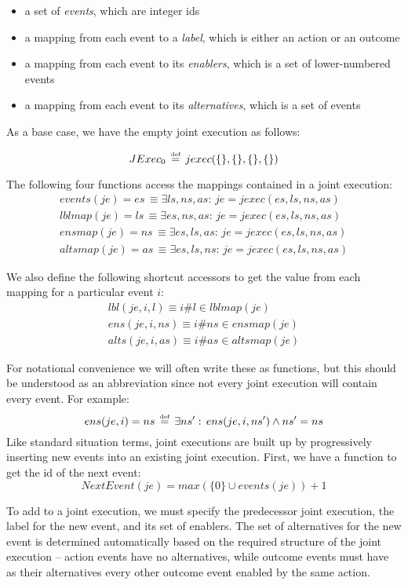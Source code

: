 \begin{itemize}
\item a set of \emph{events}, which are integer ids
\item a mapping from each event to a \emph{label}, which is either an action
or an outcome
\item a mapping from each event to its \emph{enablers}, which is a set of
lower-numbered events
\item a mapping from each event to its \emph{alternatives}, which is a set
of events
\end{itemize}
As a base case, we have the empty joint execution as follows:

\[
JExec_{0}\,\stackrel{\mbox{\tiny def}}{=}\, jexec(\{\},\{\},\{\},\{\})\]


The following four functions access the mappings contained in a joint
execution:\begin{gather*}
events(je)=es\,\equiv\exists ls,ns,as:\, je=jexec(es,ls,ns,as)\\
lblmap(je)=ls\,\equiv\exists es,ns,as:\, je=jexec(es,ls,ns,as)\\
ensmap(je)=ns\,\equiv\exists es,ls,as:\, je=jexec(es,ls,ns,as)\\
altsmap(je)=as\,\equiv\exists es,ls,ns:\, je=jexec(es,ls,ns,as)\end{gather*}


We also define the following shortcut accessors to get the value from
each mapping for a particular event $i$:\begin{gather*}
lbl(je,i,l)\equiv i\#l\in lblmap(je)\\
ens(je,i,ns)\equiv i\#ns\in ensmap(je)\\
alts(je,i,as)\equiv i\#as\in altsmap(je)\end{gather*}


For notational convenience we will often write these as functions,
but this should be understood as an abbreviation since not every joint
execution will contain every event. For example:\[
ens(je,i)=ns\,\stackrel{\mbox{\tiny def}}{=}\,\exists ns':\, ens(je,i,ns')\wedge ns'=ns\]
Like standard situation terms, joint executions are built up by progressively
inserting new events into an existing joint execution. First, we have
a function to get the id of the next event:\[
NextEvent(je)=max(\{0\}\cup events(je))+1\]


To add to a joint execution, we must specify the predecessor joint
execution, the label for the new event, and its set of enablers. The
set of alternatives for the new event is determined automatically
based on the required structure of the joint execution -- action events
have no alternatives, while outcome events must have as their alternatives
every other outcome event enabled by the same action.

